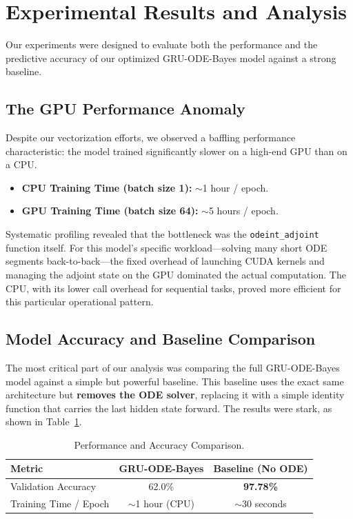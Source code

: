 \section{Experimental Results and Analysis}
\label{sec:results}

Our experiments were designed to evaluate both the performance and the predictive accuracy of our 
optimized GRU-ODE-Bayes model against a strong baseline.

\subsection{The GPU Performance Anomaly}

Despite our vectorization efforts, we observed a baffling performance characteristic: 
the model trained significantly slower on a high-end GPU than on a CPU.
\begin{itemize}
    \item \textbf{CPU Training Time (batch size 1):} $\sim$1 hour / epoch.
    \item \textbf{GPU Training Time (batch size 64):} $\sim$5 hours / epoch.
\end{itemize}

Systematic profiling revealed that the bottleneck was the \texttt{odeint\_adjoint} function itself. 
For this model's specific workload—solving many short ODE segments back-to-back—the fixed overhead of 
launching CUDA kernels and managing the adjoint state on the GPU dominated the actual computation. 
The CPU, with its lower call overhead for sequential tasks, proved more efficient for this particular operational pattern.

\subsection{Model Accuracy and Baseline Comparison}

The most critical part of our analysis was comparing the full GRU-ODE-Bayes model against 
a simple but powerful baseline. 
This baseline uses the exact same architecture but \textbf{removes the ODE solver}, 
replacing it with a simple identity function that carries the last hidden state forward. 
The results were stark, as shown in Table~\ref{tab:results}.

\begin{table}[h]
  \centering
  \caption{Performance and Accuracy Comparison.}
  \label{tab:results}
  \begin{tabular}{l c c}
    \toprule
    \textbf{Metric} & \textbf{GRU-ODE-Bayes} & \textbf{Baseline (No ODE)} \\
    \midrule
    Validation Accuracy & 62.0\% & \textbf{97.78\%} \\
    Training Time / Epoch & $\sim$1 hour (CPU) & $\sim$30 seconds \\
    \bottomrule
  \end{tabular}
\end{table}

